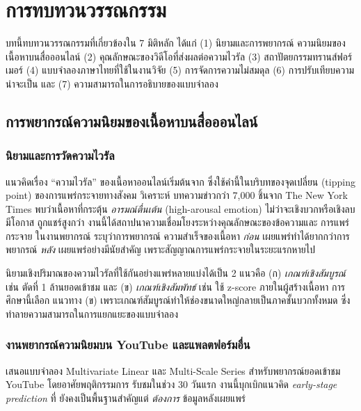 \chapter{การทบทวนวรรณกรรม}
\label{ch:litreview}

บทนี้ทบทวนวรรณกรรมที่เกี่ยวข้องใน 7 มิติหลัก ได้แก่ (1) นิยามและการพยากรณ์
ความนิยมของเนื้อหาบนสื่อออนไลน์ (2) คุณลักษณะของวิดีโอที่ส่งผลต่อความไวรัล
(3) สถาปัตยกรรมทรานส์ฟอร์เมอร์ (4) แบบจำลองภาษาไทยที่ใช้ในงานวิจัย
(5) การจัดการความไม่สมดุล (6) การปรับเทียบความน่าจะเป็น และ
(7) ความสามารถในการอธิบายของแบบจำลอง

\section{การพยากรณ์ความนิยมของเนื้อหาบนสื่อออนไลน์}
\label{sec:lit-virality}

\subsection{นิยามและการวัดความไวรัล}

แนวคิดเรื่อง ``ความไวรัล'' ของเนื้อหาออนไลน์เริ่มต้นจาก \textcite{gladwell2000tipping} ซึ่งใช้คำนี้ในบริบทของจุดเปลี่ยน (tipping point)
ของการแพร่กระจายทางสังคม \textcite{berger2012makes} วิเคราะห์
บทความข่าวกว่า 7{,}000 ชิ้นจาก The New York Times พบว่าเนื้อหาที่กระตุ้น
\emph{อารมณ์ตื่นเต้น} (high-arousal emotion) ไม่ว่าจะเชิงบวกหรือเชิงลบมีโอกาส
ถูกแชร์สูงกว่า งานนี้ได้สถาปนาความเชื่อมโยงระหว่างคุณลักษณะของข้อความและ
การแพร่กระจาย ในงานพยากรณ์ \textcite{cheng2014can} ระบุว่าการพยากรณ์
ความสำเร็จของเนื้อหา \emph{ก่อน} เผยแพร่ทำได้ยากกว่าการพยากรณ์ \emph{หลัง}
เผยแพร่อย่างมีนัยสำคัญ เพราะสัญญาณการแพร่กระจายในระยะแรกหายไป

นิยามเชิงปริมาณของความไวรัลที่ใช้กันอย่างแพร่หลายแบ่งได้เป็น 2 แนวคือ
(ก) \emph{เกณฑ์เชิงสัมบูรณ์} เช่น \textcite{trzcinski2017popularity}
ตัดที่ 1 ล้านยอดเข้าชม และ (ข) \emph{เกณฑ์เชิงสัมพัทธ์} เช่น \textcite{khosla2014popularity} ใช้ z-score ภายในผู้สร้างเนื้อหา การศึกษานี้เลือก
แนวทาง (ข) เพราะเกณฑ์สัมบูรณ์ทำให้ช่องขนาดใหญ่กลายเป็นภาคชั้นบวกทั้งหมด ซึ่ง
ทำลายความสามารถในการแยกแยะของแบบจำลอง

\subsection{งานพยากรณ์ความนิยมบน YouTube และแพลตฟอร์มอื่น}

\textbf{\textcite{pinto2013using}} เสนอแบบจำลอง Multivariate Linear
และ Multi-Scale Series สำหรับพยากรณ์ยอดเข้าชม YouTube โดยอาศัยพฤติกรรมการ
รับชมในช่วง 30 วันแรก งานนี้บุกเบิกแนวคิด \emph{early-stage prediction} ที่
ยังคงเป็นพื้นฐานสำคัญแต่ \emph{ต้องการ} ข้อมูลหลังเผยแพร่

